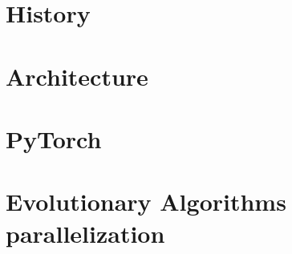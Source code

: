 \section{History}







\section{Architecture}




\section{PyTorch}




\section{Evolutionary Algorithms parallelization}

